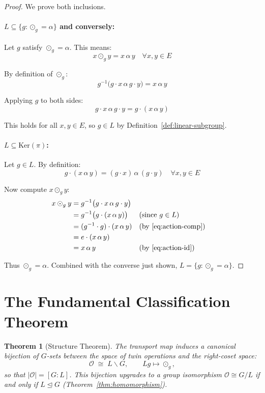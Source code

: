 \documentclass[11pt,a4paper,openany]{book}
\theoremstyle{plain}
\newtheorem{theorem}{Theorem}[chapter]
\theoremstyle{definition}
\newcommand{\twing}[1]{\odot_{#1}}
\newcommand{\opspace}{\mathcal{O}}
\newcommand{\lingroup}{L}
\newcommand{\actspace}{E}
\newcommand{\groupG}{G}
\newcommand{\Ker}{\mathrm{Ker}}
\begin{document}
\begin{proof}
We prove both inclusions.

\paragraph{$\lingroup \subseteq \{g:\twing{g}=\alpha\}$ and conversely:} Let $g$ satisfy $\twing{g} = \alpha$. This means:
\[
x \twing{g} y = x \,\alpha\, y \quad \forall x,y \in \actspace
\]

By definition of $\twing{g}$:
\[
g^{-1}\big(g \cdot x \,\alpha\, g \cdot y\big) = x \,\alpha\, y
\]

Applying $g$ to both sides:
\[
g \cdot x \,\alpha\, g \cdot y = g \cdot (x \,\alpha\, y)
\]

This holds for all $x, y \in \actspace$, so $g \in \lingroup$ by Definition~\ref{def:linear-subgroup}.

\paragraph{$\lingroup \subseteq \Ker(\pi)$:} Let $g \in \lingroup$. By definition:
\[
g \cdot (x \,\alpha\, y) = (g \cdot x) \,\alpha\, (g \cdot y) \quad \forall x,y \in \actspace
\]

Now compute $x \twing{g} y$:
\begin{align*}
x \twing{g} y &= g^{-1}\big(g \cdot x \,\alpha\, g \cdot y\big) \\
&= g^{-1}\big(g \cdot (x \,\alpha\, y)\big) && \text{(since $g \in \lingroup$)} \\
&= (g^{-1} \cdot g) \cdot (x \,\alpha\, y) && \text{(by \eqref{eq:action-comp})} \\
&= e \cdot (x \,\alpha\, y) \\
&= x \,\alpha\, y && \text{(by \eqref{eq:action-id})}
\end{align*}

Thus $\twing{g} = \alpha$. Combined with the converse just shown, $\lingroup = \{g:\twing{g}=\alpha\}$.
\end{proof}

\section{The Fundamental Classification Theorem}

\begin{theorem}[Structure Theorem]\label{thm:main-structure}
The transport map induces a canonical bijection of $\groupG$-sets between the space of twin operations and the right-coset space:
\[
\opspace \;\cong\; \lingroup\backslash\groupG ,\qquad \lingroup g \longmapsto \twing{g},
\]
so that $|\opspace| = [\groupG : \lingroup]$. This bijection upgrades to a group isomorphism $\opspace \cong \groupG/\lingroup$ \emph{if and only if} $\lingroup \trianglelefteq \groupG$ (Theorem~\ref{thm:homomorphism}).
\end{theorem}
\end{document}
